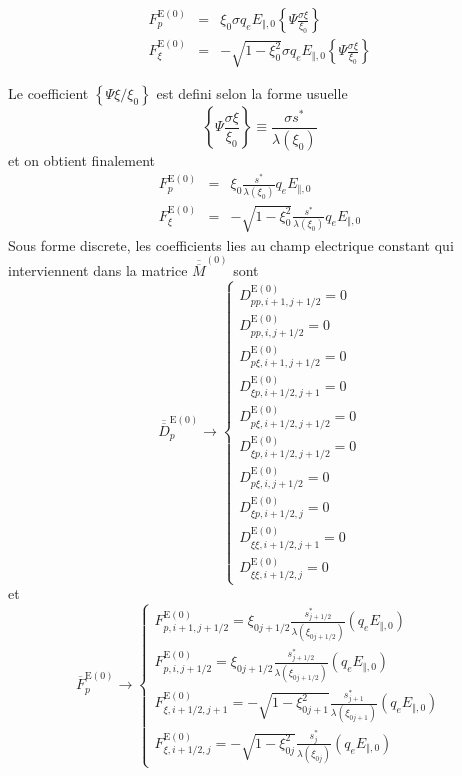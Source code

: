\begin{eqnarray*}
F_{p}^{\text{E}(0)} & = & \xi_{0}\sigma q_{e}E_{\Vert,0}\left\{ \Psi\frac{\sigma\xi}{\xi_{0}}\right\} \\
F_{\xi}^{\text{E}(0)} & = & -\sqrt{1-\xi_{0}^{2}}\sigma q_{e}E_{\Vert,0}\left\{ \Psi\frac{\sigma\xi}{\xi_{0}}\right\} \end{eqnarray*}


Le coefficient $\left\{ \Psi\xi/\xi_{0}\right\} $ est defini selon
la forme usuelle \[
\left\{ \Psi\frac{\sigma\xi}{\xi_{0}}\right\} \equiv\frac{\sigma s^{\ast}}{\lambda\left(\xi_{0}\right)}\]
 et on obtient finalement \begin{eqnarray*}
F_{p}^{\text{E}(0)} & = & \xi_{0}\frac{s^{\ast}}{\lambda\left(\xi_{0}\right)}q_{e}E_{\Vert,0}\\
F_{\xi}^{\text{E}(0)} & = & -\sqrt{1-\xi_{0}^{2}}\frac{s^{\ast}}{\lambda\left(\xi_{0}\right)}q_{e}E_{\Vert,0}\end{eqnarray*}
 Sous forme discrete, les coefficients lies au champ electrique constant
qui interviennent dans la matrice $\overline{\overline{M}}^{\left(0\right)}$
sont \[
\overline{\overline{D}}_{p}^{\text{E}(0)}\rightarrow\left\{ \begin{array}{l}
D_{pp,i+1,j+1/2}^{\text{E}\left(0\right)}=0\\
D_{pp,i,j+1/2}^{\text{E}\left(0\right)}=0\\
D_{p\xi,i+1,j+1/2}^{\text{E}\left(0\right)}=0\\
D_{\xi p,i+1/2,j+1}^{\text{E}\left(0\right)}=0\\
D_{p\xi,i+1/2,j+1/2}^{\text{E}\left(0\right)}=0\\
D_{\xi p,i+1/2,j+1/2}^{\text{E}\left(0\right)}=0\\
D_{p\xi,i,j+1/2}^{\text{E}\left(0\right)}=0\\
D_{\xi p,i+1/2,j}^{\text{E}\left(0\right)}=0\\
D_{\xi\xi,i+1/2,j+1}^{\text{E}\left(0\right)}=0\\
D_{\xi\xi,i+1/2,j}^{\text{E}\left(0\right)}=0\end{array}\right.\]
 et \[
\overline{F}_{p}^{\text{E}(0)}\rightarrow\left\{ \begin{array}{l}
F_{p,i+1,j+1/2}^{\text{E}(0)}=\xi_{0j+1/2}\frac{s_{j+1/2}^{\ast}}{\lambda\left(\xi_{0j+1/2}\right)}(q_{e}E_{\Vert,0})\\
F_{p,i,j+1/2}^{\text{E}(0)}=\xi_{0j+1/2}\frac{s_{j+1/2}^{\ast}}{\lambda\left(\xi_{0j+1/2}\right)}(q_{e}E_{\Vert,0})\\
F_{\xi,i+1/2,j+1}^{\text{E}(0)}=-\sqrt{1-\xi_{0j+1}^{2}}\frac{s_{j+1}^{\ast}}{\lambda\left(\xi_{0j+1}\right)}(q_{e}E_{\Vert,0})\\
F_{\xi,i+1/2,j}^{\text{E}(0)}=-\sqrt{1-\xi_{0j}^{2}}\frac{s_{j}^{\ast}}{\lambda\left(\xi_{0j}\right)}(q_{e}E_{\Vert,0})\end{array}\right.\]

